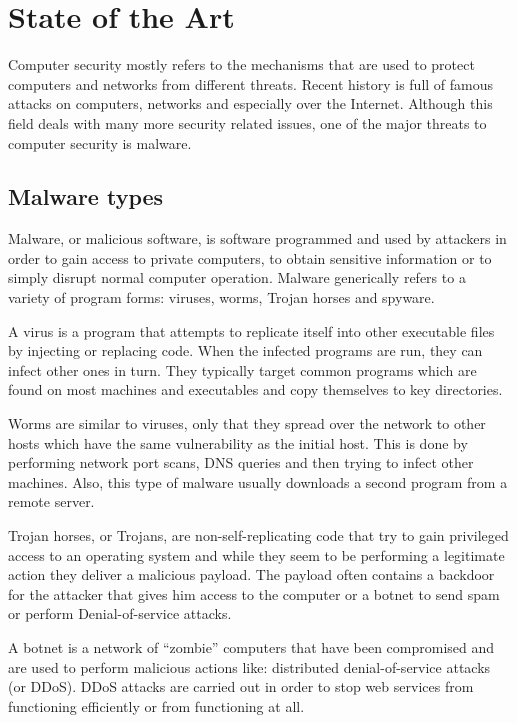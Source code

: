 \chapter{State of the Art}
\label{chapter:second}

Computer security mostly refers to the mechanisms that are used to protect computers and networks from different threats. Recent history is full of famous attacks on computers, networks and especially over the Internet. Although this field deals with many more security related issues, one of the major threats to computer security is malware.

\section{Malware types}
\label{sec:mal-types}

Malware, or malicious software, is software programmed and used by attackers in order to gain access to private computers, to obtain sensitive information or to simply disrupt normal computer operation. Malware generically refers to a variety of program forms: viruses, worms, Trojan horses and spyware.

A virus is a program that attempts to replicate itself into other executable files by injecting or replacing code. When the infected programs are run, they can infect other ones in turn. They typically target common programs which are found on most machines and executables and copy themselves to key directories.

Worms are similar to viruses, only that they spread over the network to other hosts which have the same vulnerability as the initial host. This is done by performing network port scans, DNS queries and then trying to infect other machines. Also, this type of malware usually downloads a second program from a remote server.

Trojan horses, or Trojans, are non-self-replicating code that try to gain privileged access to an operating system and while they seem to be performing a legitimate action they deliver a malicious payload. The payload often contains a backdoor for the attacker that gives him access to the computer or a botnet to send spam or perform Denial-of-service attacks.

A botnet is a network of ``zombie'' computers that have been compromised and are used to perform malicious actions like: distributed denial-of-service attacks (or DDoS). DDoS attacks are carried out in order to stop web services from functioning efficiently or from functioning at all.

